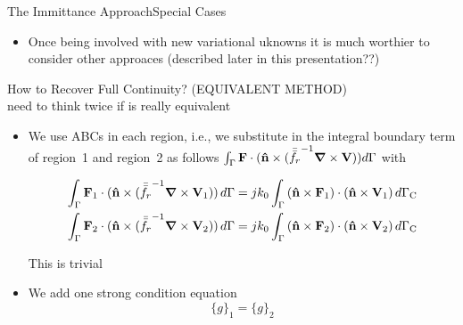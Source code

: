 \begin{frame}[allowframebreaks]{The Immittance Approach}{Special Cases}
\begin{itemize}
  \item Once being involved with new variational uknowns it is much
    worthier to consider other approaces (\alert{described later in
      this presentation??})
    
  \end{itemize}
      
  \framebreak  %

  \begin{center}
    How to Recover Full Continuity? (EQUIVALENT METHOD) \\ \alert{need
      to think twice if is really equivalent}
  \end{center}

  \begin{itemize}
  \item We use ABCs in each region, i.e., we substitute in the integral
    boundary term of region~1 and region~2 as follows
    $\int_{\Gamma} \mathbf{F}\cdot(\mathbf{\hat{n}} \times ( {\bar{\bar{f_r}}}^{-1}
    \boldsymbol{\nabla} \times \mathbf{V} )) d\Gamma$ with

    \begin{equation*}
      \begin{split}
        \int_{\Gamma} \mathbf{F}_1\cdot(\mathbf{\hat{n}} \times ( {\bar{\bar{f_r}}}^{-1} \boldsymbol{\nabla} \times \mathbf{V}_1 )) \,d\Gamma
        &= 
        jk_0 \int_{\Gamma} \left( \mathbf{\hat{n}} \times \mathbf{F}_1 \right) \cdot \left( \mathbf{\hat{n}} \times \mathbf{V}_1 \right) d\Gamma_\text{C}
        \\
        \int_{\Gamma} \mathbf{F}_2\cdot(\mathbf{\hat{n}} \times ( {\bar{\bar{f_r}}}^{-1} \boldsymbol{\nabla} \times \mathbf{V}_2 )) \,d\Gamma
        &= 
        jk_0 \int_{\Gamma} \left( \mathbf{\hat{n}} \times \mathbf{F}_2 \right) \cdot \left( \mathbf{\hat{n}} \times \mathbf{V}_2 \right) d\Gamma_\text{C}
      \end{split}
    \end{equation*}

    This is trivial

    \item We add one strong condition equation
      \begin{equation*}
         \lbrace g\rbrace_1 =  \lbrace g\rbrace_2 
      \end{equation*}
    \end{itemize}
      
  \end{frame}


